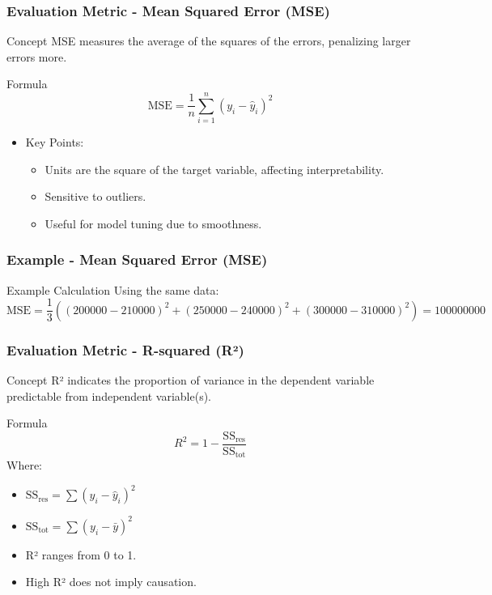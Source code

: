 \documentclass[aspectratio=169]{beamer}
\begin{document}
\begin{frame}[fragile]
    \frametitle{Evaluation Metric - Mean Squared Error (MSE)}
    \begin{block}{Concept}
        MSE measures the average of the squares of the errors, penalizing larger errors more.
    \end{block}
    \begin{block}{Formula}
        \[
        \text{MSE} = \frac{1}{n} \sum_{i=1}^{n} (y_i - \hat{y}_i)^2
        \]
    \end{block}
    \begin{itemize}
        \item Key Points:
        \begin{itemize}
            \item Units are the square of the target variable, affecting interpretability.
            \item Sensitive to outliers.
            \item Useful for model tuning due to smoothness.
        \end{itemize}
    \end{itemize}
\end{frame}

\begin{frame}[fragile]
    \frametitle{Example - Mean Squared Error (MSE)}
    \begin{block}{Example Calculation}
        Using the same data:
        \begin{equation}
            \text{MSE} = \frac{1}{3} \left( (200000 - 210000)^2 + (250000 - 240000)^2 + (300000 - 310000)^2 \right) = 100000000
        \end{equation}
    \end{block}
\end{frame}

\begin{frame}[fragile]
    \frametitle{Evaluation Metric - R-squared (R²)}
    \begin{block}{Concept}
        R² indicates the proportion of variance in the dependent variable predictable from independent variable(s).
    \end{block}
    \begin{block}{Formula}
        \[
        R^2 = 1 - \frac{\text{SS}_{\text{res}}}{\text{SS}_{\text{tot}}}
        \]
        Where:
        \begin{itemize}
            \item \(\text{SS}_{\text{res}} = \sum (y_i - \hat{y}_i)^2\)
            \item \(\text{SS}_{\text{tot}} = \sum (y_i - \bar{y})^2\)
        \end{itemize}
    \end{block}
    \begin{itemize}
        \item R² ranges from 0 to 1.
        \item High R² does not imply causation.
    \end{itemize}
\end{frame}
\end{document}
